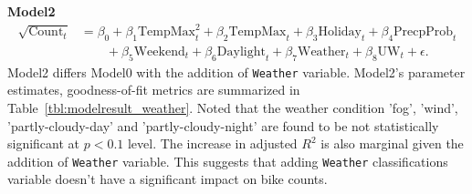 \documentclass [11pt, proquest] {uwthesis}[2015/03/03]
\begin{document}
\textbf{Model2}
\begin{align}
\sqrt{\text{Count}_t} &= \beta_0 + \beta_1 \text{TempMax}^2_t + \beta_2 \text{TempMax}_t + \beta_3 \text{Holiday}_t + \beta_4 \text{PrecpProb}_t  \nonumber\\
&\qquad + \beta_5 \text{Weekend}_t + \beta_6 \text{Daylight}_t + \beta_7 \text{Weather}_t  + \beta_8 \text{UW}_t + \epsilon.\label{eqref:model2}
\end{align}
Model2 differs Model0 with the addition of \texttt{Weather} variable. Model2's parameter estimates, goodness-of-fit metrics are summarized in Table~\ref{tbl:modelresult_weather}. Noted that the weather condition 'fog', 'wind', 'partly-cloudy-day' and 'partly-cloudy-night' are found to be not statistically significant at $p<0.1$ level. The increase in adjusted $R^2$ is also marginal given the addition of \texttt{Weather} variable. This suggests that adding \texttt{Weather} classifications variable doesn't have a significant impact on bike counts.
\end{document}
